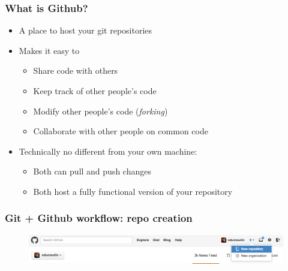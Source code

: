\documentclass[mathserif, xcolor=dvipsnames]{beamer}
\begin{document}
\begin{frame}
    \frametitle{What is Github?}
    \begin{itemize}\addtolength{\itemsep}{0.5\baselineskip}
        \item{A place to host your git repositories}
        \item{Makes it easy to
              \begin{itemize}
                  \item{Share code with others}
                  \item{Keep track of other people's code}
                  \item{Modify other people's code (\emph{forking})}
                  \item{Collaborate with other people on common code}
              \end{itemize}}
        \item{Technically no different from your own machine:
              \begin{itemize}
                  \item{Both can pull and push changes}
                  \item{Both host a fully functional version of your repository}
              \end{itemize}}
    \end{itemize}
\end{frame}

\begin{frame}
    \frametitle{Git + Github workflow: repo creation}
    \begin{figure}[H]
        \includegraphics[width=\textwidth]{repo_creation_1.png}
    \end{figure}
\end{frame}
\end{document}
